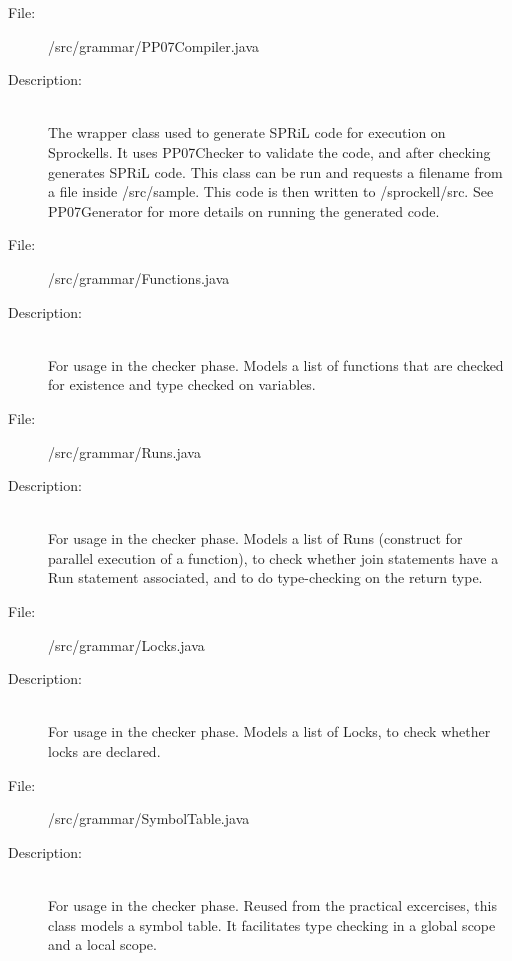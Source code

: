 \documentclass[10pt,a4paper]{report}
\begin{document}
\begin{description}
	\item[File:] /src/grammar/PP07Compiler.java
	\item[Description:] \hfill \\
		The wrapper class used to generate SPRiL code for execution on Sprockells. It uses PP07Checker to validate the code, and after checking generates SPRiL code. This class can be run and requests a filename from a file inside /src/sample. This code is then written to /sprockell/src. See PP07Generator for more details on running the generated code. 
\end{description}

\begin{description}
	\item[File:] /src/grammar/Functions.java
	\item[Description:] \hfill \\
		For usage in the checker phase. Models a list of functions that are checked for existence and type checked on variables.  
\end{description}

\begin{description}
	\item[File:] /src/grammar/Runs.java
	\item[Description:] \hfill \\
		For usage in the checker phase. Models a list of Runs (construct for parallel execution of a function), to check whether join statements have a Run statement associated, and to do type-checking on the return type.
\end{description}

\begin{description}
	\item[File:] /src/grammar/Locks.java
	\item[Description:] \hfill \\
		For usage in the checker phase. Models a list of Locks, to check whether locks are declared.
\end{description}

\begin{description}
	\item[File:] /src/grammar/SymbolTable.java
	\item[Description:] \hfill \\
		For usage in the checker phase. Reused from the practical excercises, this class models a symbol table. It facilitates type checking in a global scope and a local scope. 
\end{description}
\end{document}

